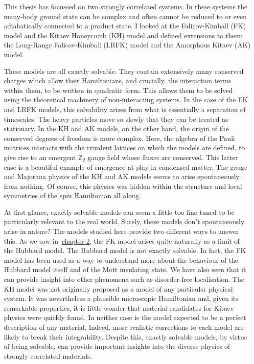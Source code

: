This thesis has focussed on two strongly correlated systems. In these systems the many-body ground state can be complex and often cannot be reduced to or even adiabatically connected to a product state. I looked at the Falicov-Kimball (FK) model and the Kitaev Honeycomb (KH) model and defined extensions to them: the Long-Range Falicov-Kimball (LRFK) model and the Amorphous Kitaev (AK) model.

These models are all exactly solvable. They contain extensively many conserved charges which allow their Hamiltonians, and crucially, the interaction terms within them, to be written in quadratic form. This allows them to be solved using the theoretical machinery of non-interacting systems. In the case of the FK and LRFK models, this solvability arises from what is essentially a separation of timescales. The heavy particles move so slowly that they can be treated as stationary. In the KH and AK models, on the other hand, the origin of the conserved degrees of freedom is more complex. Here, the algebra of the Pauli matrices interacts with the trivalent lattices on which the models are defined, to give rise to an emergent \(\mathbb{Z}_2\) gauge field whose fluxes are conserved. This latter case is a beautiful example of emergence at play in condensed matter. The gauge and Majorana physics of the KH and AK models seems to arise spontaneously from nothing. Of course, this physics was hidden within the structure and local symmetries of the spin Hamiltonian all along.

At first glance, exactly solvable models can seem a little too fine tuned to be particularly relevant to the real world. Surely, these models don't spontaneously arise in nature? The models studied here provide two different ways to answer this. As we saw in~\protect\hyperlink{chap:2-background}{chapter 2}, the FK model arises quite naturally as a limit of the Hubbard model. The Hubbard model is not exactly solvable. In fact, the FK model has been used as a way to understand more about the behaviour of the Hubbard model itself and of the Mott insulating state. We have also seen that it can provide insight into other phenomena such as disorder-free localisation. The KH model was not originally proposed as a model of any particular physical system. It was nevertheless a plausible microscopic Hamiltonian and, given its remarkable properties, it is little wonder that material candidates for Kitaev physics were quickly found. In neither case is the model expected to be a perfect description of any material. Indeed, more realistic corrections to each model are likely to break their integrability. Despite this, exactly solvable models, by virtue of being solvable, can provide important insights into the diverse physics of strongly correlated materials.

